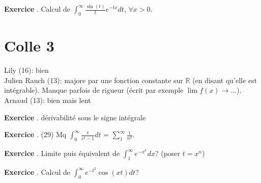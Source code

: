 \documentclass[10pt,a4paper]{article}
\newcounter{question}
\newcounter{exo}
\newenvironment{exo}{\vspace{0.5cm}\setcounter{question}{0}\addtocounter{exo}{1} \noindent \textbf{Exercice \theexo}. \normalsize }{\par}
\begin{document}
	\begin{exo}
		Calcul de $\int_0^{\infty} \frac{\sin(t)}{t} e^{-tx} dt$, $\forall x > 0$.
	\end{exo}
		
	\section*{Colle 3}
	\setcounter{exo}{0}
	Lily (16): bien\\
	Julien Rauch (13): majore par une fonction constante sur $\mathbb{R}$ (en disant qu'elle est intégrable). Manque parfois de rigueur (écrit par exemple $\lim f(x) \longrightarrow ...$). \\
	Arnaud (13): bien mais lent\\
	
	\begin{exo}
		dérivabilité sous le signe intégrale
	\end{exo}

	\begin{exo} (29)
		Mq $\int_0^\infty \frac{t}{e^t - 1} dt$ = $\sum_1^\infty \frac{1}{n^2}$.
	\end{exo}
	
	\begin{exo}
		Limite puis équivalent de $\int_{1}^{\infty} e^{-x^n} dx$? (poser $t = x^n$)
	\end{exo}

	\begin{exo}
		Calcul de $\int_0^{\infty} e^{-t^2} \cos(xt) dt$?
	\end{exo}
\end{document}
